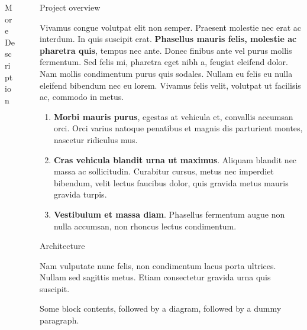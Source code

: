 \documentclass[final]{beamer}
\newlength{\sepwidth}
\newlength{\colwidth}
\newcommand{\separatorcolumn}{\begin{column}{\sepwidth}\end{column}}
\begin{document}
\begin{frame}[t]
\begin{columns}[t]
\begin{column}{\colwidth}
\begin{block}{More Description}
  \end{block}


\end{column}

\separatorcolumn

\begin{column}{\colwidth}

  \begin{block}{Project overview}

    Vivamus congue volutpat elit non semper. Praesent molestie nec erat ac
    interdum. In quis suscipit erat. \textbf{Phasellus mauris felis, molestie
    ac pharetra quis}, tempus nec ante. Donec finibus ante vel purus mollis
    fermentum. Sed felis mi, pharetra eget nibh a, feugiat eleifend dolor. Nam
    mollis condimentum purus quis sodales. Nullam eu felis eu nulla eleifend
    bibendum nec eu lorem. Vivamus felis velit, volutpat ut facilisis ac,
    commodo in metus.

    \begin{enumerate}
      \item \textbf{Morbi mauris purus}, egestas at vehicula et, convallis
        accumsan orci. Orci varius natoque penatibus et magnis dis parturient
        montes, nascetur ridiculus mus.
      \item \textbf{Cras vehicula blandit urna ut maximus}. Aliquam blandit nec
        massa ac sollicitudin. Curabitur cursus, metus nec imperdiet bibendum,
        velit lectus faucibus dolor, quis gravida metus mauris gravida turpis.
      \item \textbf{Vestibulum et massa diam}. Phasellus fermentum augue non
        nulla accumsan, non rhoncus lectus condimentum.
    \end{enumerate}

  \end{block}

  \begin{block}{Architecture}

    Nam vulputate nunc felis, non condimentum lacus porta ultrices. Nullam sed
    sagittis metus. Etiam consectetur gravida urna quis suscipit.

    Some block contents, followed by a diagram, followed by a dummy paragraph.


\end{block}
\end{column}
\end{columns}
\end{frame}
\end{document}

